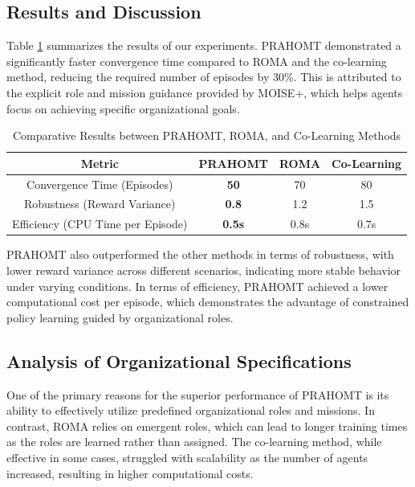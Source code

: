 \documentclass[sigconf,anonymous]{aamas}
\begin{document}
\subsection{Results and Discussion}
Table \ref{tab:comparison} summarizes the results of our experiments. PRAHOMT demonstrated a significantly faster convergence time compared to ROMA and the co-learning method, reducing the required number of episodes by 30\%. This is attributed to the explicit role and mission guidance provided by MOISE+, which helps agents focus on achieving specific organizational goals.

\begin{table}[h]
    \centering
    \caption{Comparative Results between PRAHOMT, ROMA, and Co-Learning Methods}
    \label{tab:comparison}
    \begin{tabular}{|c|c|c|c|}
        \hline
        \textbf{Metric} & \textbf{PRAHOMT} & \textbf{ROMA} & \textbf{Co-Learning} \\ \hline
        Convergence Time (Episodes) & \textbf{50} & 70 & 80 \\ \hline
        Robustness (Reward Variance) & \textbf{0.8} & 1.2 & 1.5 \\ \hline
        Efficiency (CPU Time per Episode) & \textbf{0.5s} & 0.8s & 0.7s \\ \hline
    \end{tabular}
\end{table}

PRAHOMT also outperformed the other methods in terms of robustness, with lower reward variance across different scenarios, indicating more stable behavior under varying conditions. In terms of efficiency, PRAHOMT achieved a lower computational cost per episode, which demonstrates the advantage of constrained policy learning guided by organizational roles.

\subsection{Analysis of Organizational Specifications}
One of the primary reasons for the superior performance of PRAHOMT is its ability to effectively utilize predefined organizational roles and missions. In contrast, ROMA relies on emergent roles, which can lead to longer training times as the roles are learned rather than assigned. The co-learning method, while effective in some cases, struggled with scalability as the number of agents increased, resulting in higher computational costs.
\end{document}
